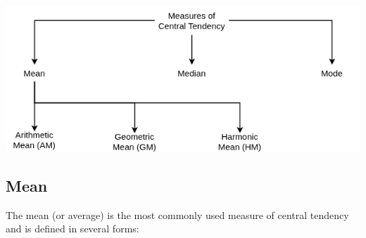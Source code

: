 \documentclass[twoside]{book}
\begin{document}


\begin{center}
    \includegraphics[scale=0.5]{pic/moct.drawio.png}
\end{center}

\subsection{Mean}

The mean (or average) is the most commonly used measure of central tendency and is defined in several forms:
\end{document}
